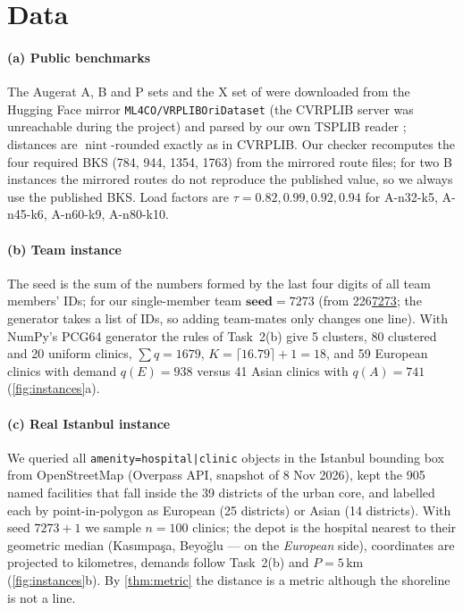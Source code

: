 \section{Data}\label{sec:data}
\paragraph{(a) Public benchmarks} The Augerat A, B and P sets and the X set of
\citet{uchoa2017new} were downloaded from the Hugging Face mirror \texttt{ML4CO/VRPLIBOriDataset}
\citep{ml4co2024vrplib} (the CVRPLIB server was unreachable during the project) and parsed by our
own TSPLIB reader \citep{reinelt1991tsplib}; distances are $\operatorname{nint}$-rounded exactly
as in CVRPLIB. Our checker recomputes the four required BKS (784, 944, 1354, 1763) from the mirrored
route files; for two B instances the mirrored routes do not reproduce the published value, so we always
use the published BKS. Load factors are $\tau=0.82, 0.99, 0.92, 0.94$ for A-n32-k5, A-n45-k6, A-n60-k9,
A-n80-k10.

\paragraph{(b) Team instance} The seed is the sum of the numbers formed by the last four digits of all
team members' IDs; for our single-member team $\textbf{seed}=7273$ (from 226\underline{7273}; the generator
takes a list of IDs, so adding team-mates only changes one line). With NumPy's PCG64 generator the rules of
Task~2(b) give 5 clusters, 80 clustered and 20 uniform clinics, $\sum q=1679$, $K=\lceil16.79\rceil+1=18$, and
59 European clinics with demand $q(E)=938$ versus 41 Asian clinics with $q(A)=741$ (\cref{fig:instances}a).

\paragraph{(c) Real Istanbul instance} We queried all \texttt{amenity=hospital|clinic} objects in the
Istanbul bounding box from OpenStreetMap (Overpass API, snapshot of 8 Nov 2026), kept the 905 named
facilities that fall inside the 39 districts of the urban core, and labelled each by point-in-polygon as
European (25 districts) or Asian (14 districts). With seed $7273+1$ we sample $n=100$ clinics; the depot is
the hospital nearest to their geometric median (Kas{\i}mpa\c{s}a, Beyo\u{g}lu --- on the \emph{European}
side), coordinates are projected to kilometres, demands follow Task~2(b) and $P=5$\,km
(\cref{fig:instances}b). By \cref{thm:metric} the distance is a metric although the shoreline is not a line.

